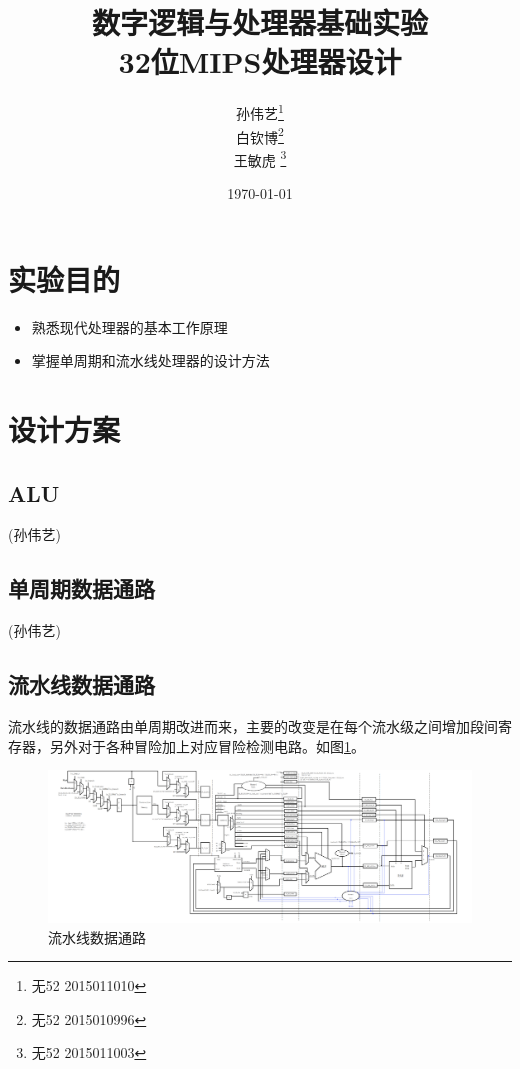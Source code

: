 \documentclass{ctexart}
\begin{document}
	\title{数字逻辑与处理器基础实验 \\ 32位MIPS处理器设计}
	\author{孙伟艺\thanks{无52 2015011010}\\ 白钦博\thanks{无52 2015010996} \\ 王敏虎 \thanks{无52 2015011003}}
	\date{\today}
	\maketitle
	\clearpage

	\section{实验目的}
	\begin{itemize}
		\item 熟悉现代处理器的基本工作原理
		\item 掌握单周期和流水线处理器的设计方法
	\end{itemize}

	\section{设计方案}
		\subsection{ALU}
			(孙伟艺)
		\subsection{单周期数据通路}
			(孙伟艺)
		\subsection{流水线数据通路}
		流水线的数据通路由单周期改进而来，主要的改变是在每个流水级之间增加段间寄存器，另外对于各种冒险加上对应冒险检测电路。如图\ref{pipeline1}。

		\begin{figure}[ht]
		\centering
		\includegraphics[width = \textwidth]{pipeline.png}
		\caption{流水线数据通路}
		\label{pipeline1}
		\end{figure}
\end{document}
